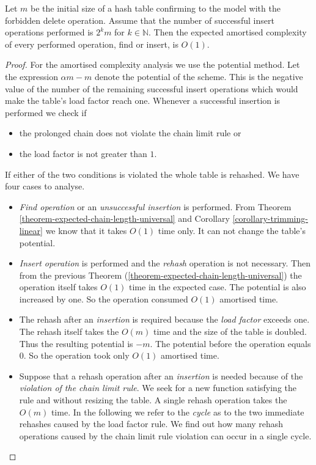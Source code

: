 \begin{theorem}
\label{theorem-no-delete-time}
Let $m$ be the initial size of a hash table confirming to the model with the forbidden delete operation. Assume that the number of successful insert operations performed is $2^k m$ for $k \in \mathbb{N}$. Then the expected amortised complexity of every performed operation, find or insert, is $O(1)$.
\end{theorem}
\begin{proof}
For the amortised complexity analysis we use the potential method. Let the expression $\alpha m - m$ denote the potential of the scheme. This is the negative value of the number of the remaining successful insert operations which would make the table's load factor reach one. Whenever a successful insertion is performed we check if 
\begin{itemize} 
\item the prolonged chain does not violate the chain limit rule or
\item the load factor is not greater than $1$.
\end{itemize} If either of the two conditions is violated the whole table is rehashed. We have four cases to analyse.
\begin{itemize}
\item \emph{Find operation} or an \emph{unsuccessful insertion} is performed. From Theorem \ref{theorem-expected-chain-length-universal} and Corollary \ref{corollary-trimming-linear} we know that it takes $O(1)$ time only. It can not change the table's potential.

\item \emph{Insert operation} is performed and the \emph{rehash} operation is not necessary. Then from the previous Theorem (\ref{theorem-expected-chain-length-universal}) the operation itself takes $O(1)$ time in the expected case. The potential is also increased by one. So the operation consumed $O(1)$ amortised time.

\item The rehash after an \emph{insertion} is required because the \emph{load factor} exceeds one. The rehash itself takes the $O(m)$ time and the size of the table is doubled. Thus the resulting potential is $-m$. The potential before the operation equals $0$. So the operation took only $O(1)$ amortised time.

\item Suppose that a rehash operation after an \emph{insertion} is needed because of the \emph{violation of the chain limit rule}. We seek for a new function satisfying the rule and without resizing the table. A single rehash operation takes the $O(m)$ time. In the following we refer to the \emph{cycle} as to the two immediate rehashes caused by the load factor rule. We find out how many rehash operations caused by the chain limit rule violation can occur in a single cycle. 


\end{itemize}
\end{proof}
